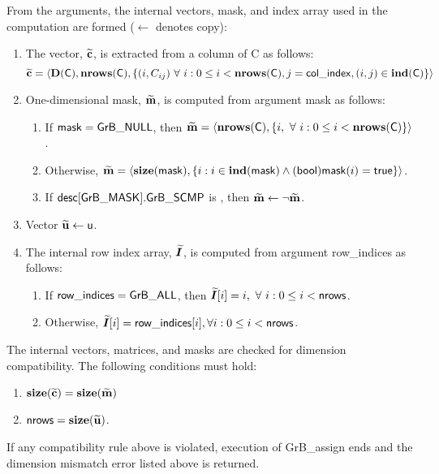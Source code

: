 From the arguments, the internal vectors, mask, and index array used in 
the computation are formed ($\leftarrow$ denotes copy):
\begin{enumerate}
	\item The vector, ${\bf \widetilde{c}}$, is extracted from a column of {\sf C}
    as follows:
    \[
        {\bf \widetilde{c}} = \langle  \bold{D}({\sf C}), \bold{nrows}({\sf C}), 
        \{ (i, C_{ij}) \ \forall \ i : 0 \leq i < \bold{nrows}({\sf C}),
        j = {\sf col\_index}, (i, j) \in \bold{ind}({\sf C})\} \rangle
    \]

	\item One-dimensional mask, ${\bf \widetilde{m}}$, is computed from 
    argument {\sf mask} as follows:
	\begin{enumerate}
		\item	If ${\sf mask} = {\sf GrB\_NULL}$, then ${\bf \widetilde{m}} = 
        \langle \bold{nrows}({\sf C}), \{i,\ \forall \ i : 0 \leq i < 
        \bold{nrows}({\sf C}) \} \rangle$.

		\item	Otherwise, ${\bf \widetilde{m}} = 
        \langle \bold{size}({\sf mask}), \{i : i \in \bold{ind}({\sf mask}) \wedge
        ({\sf bool}){\sf mask}(i) = {\sf true} \} \rangle$.

		\item	If ${\sf desc[GrB\_MASK].GrB\_SCMP}$ is \true, then 
        ${\bf \widetilde{m}} \leftarrow \neg {\bf \widetilde{m}}$.
	\end{enumerate}

	\item Vector ${\bf \widetilde{u}} \leftarrow {\sf u}$.
    
    \item The internal row index array, $\bm{\widetilde{I}}$, is computed from 
    argument {\sf row\_indices} as follows:
	\begin{enumerate}
		\item	If ${\sf row\_indices} = {\sf GrB\_ALL}$, then 
        $\bm{\widetilde{I}}[i] = i, \ \forall \ i : 0 \leq i < {\sf nrows}$.

		\item	Otherwise, $\bm{\widetilde{I}}[i] = {\sf row\_indices}[i], 
        \forall i : 0 \leq i < {\sf nrows}$.
    \end{enumerate}
\end{enumerate}

The internal vectors, matrices, and masks are checked for dimension compatibility. 
The following conditions must hold:
\begin{enumerate}
	\item $\bold{size}({\bf \widetilde{c}}) = \bold{size}({\bf \widetilde{m}})$
    \item ${\sf nrows} = \bold{size}({\bf \widetilde{u}})$.
\end{enumerate}
If any compatibility rule above is violated, execution of {\sf GrB\_assign} ends and 
the dimension mismatch error listed above is returned.

